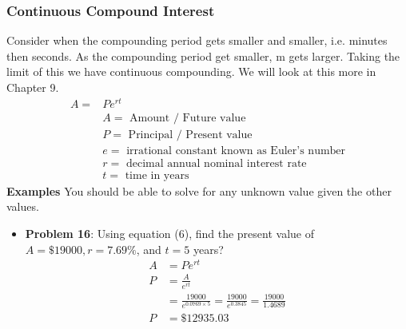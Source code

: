 \documentclass[14pt]{extarticle}
\begin{document}
\subsubsection*{Continuous Compound Interest}
Consider when the compounding period gets smaller and smaller, i.e. minutes then seconds. As the compounding period get smaller, m gets larger. Taking the limit of this we have continuous compounding. We will look at this more in Chapter 9.
\begin{align*}
	A = &Pe^{rt} \tag{6} \\
	&A = \text{ Amount / Future value} \\
	&P = \text{ Principal / Present value} \\
	&e = \text{ irrational constant known as Euler's number} \\
	&r = \text{ decimal annual nominal interest rate} \\
	&t = \text{ time in years}
\end{align*}
\textbf{Examples}
You should be able to solve for any unknown value given the other values.
\begin{itemize}
	\item \textbf{Problem 16}: Using equation (6), find the present value of $A=\$19000, r=7.69\%$, and $t=5$ years?
	\begin{align*}
		A &= Pe^{rt} \\
		P &= \frac{A}{e^{rt}} \\
		&= \frac{19000}{e^{0.0769 \times 5}} = \frac{19000}{e^{0.3845}} = \frac{19000}{1.4689} \\
		P &= \$12935.03
	\end{align*}
\end{itemize}
\end{document}
